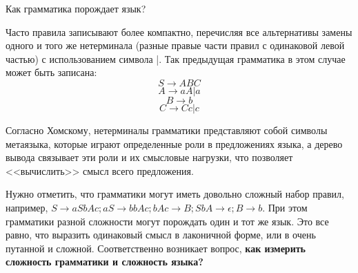 \documentclass[12pt, pdf, hyperref={unicode},handout]{beamer}
\begin{document}
\begin{frame}{Как грамматика порождает язык?}
  \begin{block}

    \small{
      Часто правила записывают более компактно, перечисляя все альтернативы замены одного и того же нетерминала (разные правые части правил с одинаковой левой частью) с использованием символа |. Так предыдущая грамматика в этом случае может быть записана:
      $$S\rightarrow ABC$$
      $$A\rightarrow aA|a$$
      $$B\rightarrow b$$
      $$C\rightarrow Cc|c$$

      Согласно Хомскому, нетерминалы грамматики представляют собой символы метаязыка, которые играют определенные роли в предложениях языка, а дерево вывода связывает эти роли и их смысловые нагрузки, что позволяет <<вычислить>> смысл всего предложения.

      Нужно отметить, что грамматики могут иметь довольно сложный набор правил, например, $S\rightarrow aSbAc; aS\rightarrow bbAc; bAc\rightarrow B; SbA\rightarrow\epsilon; B\rightarrow b$. При этом грамматики разной сложности могут порождать один и тот же язык. Это все равно, что выразить одинаковый смысл в лаконичной форме, или в очень путанной и сложной. Соответственно возникает вопрос, \textbf{как измерить сложность грамматики и сложность языка?}

      
      }

  \end{block}
  
\end{frame}
\end{document}
